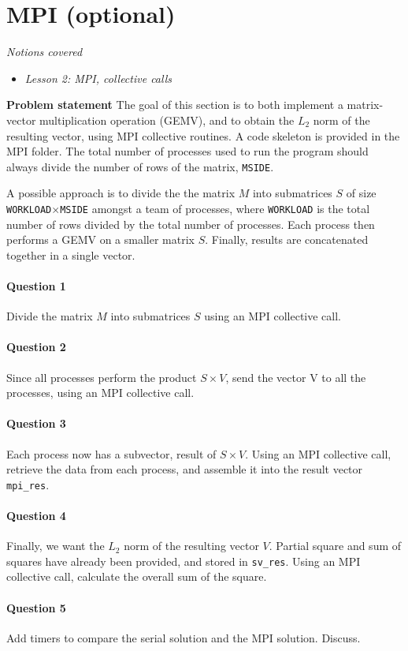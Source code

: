 \documentclass[letterpaper,10pt]{article}
\begin{document}
\newpage

\section{MPI (optional)}
\textit{Notions covered}
\begin{itemize}
 \item \textit{Lesson 2: MPI, collective calls}
\end{itemize}

\textbf{Problem statement} The goal of this section is to both implement a matrix-vector multiplication operation (GEMV), and to obtain the $L_{2}$ norm of the resulting vector, using MPI collective routines. A code skeleton is provided in the MPI folder. The total number
of processes used to run the program should always divide the number of rows of the matrix, \texttt{MSIDE}.

A possible approach is to divide the the matrix $M$ into submatrices $S$ of size \texttt{WORKLOAD}$\times$\texttt{MSIDE} amongst a team of processes, where \texttt{WORKLOAD} is the total number of rows divided by the total number of processes. 
Each process then performs a GEMV on a smaller matrix $S$. Finally, results are concatenated together in a single vector. 


\paragraph{Question 1} Divide the matrix $M$ into submatrices $S$ using an MPI collective call. 
\paragraph{Question 2} Since all processes perform the product $S\times V$, send the vector V to all the processes, using an MPI collective call.
\paragraph{Question 3} Each process now has a subvector, result of $S\times V$. Using an MPI collective call, retrieve the data from each process, and assemble it into the result vector \texttt{mpi\_res}.
\paragraph{Question 4} Finally, we want the $L_{2}$ norm of the resulting vector $V$. Partial square and sum of squares have already been provided, and stored in \texttt{sv\_res}. Using an MPI collective call, calculate
the overall sum of the square.
\paragraph{Question 5} Add timers to compare the serial solution and the MPI solution. Discuss.
\end{document}
